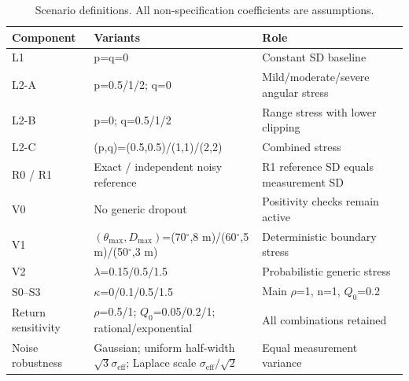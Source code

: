 \begin{table}[htbp]
\caption{Scenario definitions. All non-specification coefficients are assumptions.}\label{tab:4}
\small\setlength{\tabcolsep}{3pt}\renewcommand{\arraystretch}{1.15}
\begin{tabularx}{\linewidth}{>{\raggedright\arraybackslash}X>{\raggedright\arraybackslash}X>{\raggedright\arraybackslash}X}
\toprule
Component & Variants & Role \\
\midrule
L1 & p=q=0 & Constant SD baseline \\
L2-A & p=0.5/1/2; q=0 & Mild/moderate/severe angular stress \\
L2-B & p=0; q=0.5/1/2 & Range stress with lower clipping \\
L2-C & (p,q)=(0.5,0.5)/(1,1)/(2,2) & Combined stress \\
R0 / R1 & Exact / independent noisy reference & R1 reference SD equals measurement SD \\
V0 & No generic dropout & Positivity checks remain active \\
V1 & $(\theta_{\max},D_{\max})$=(70\texorpdfstring{\ensuremath{^\circ}}{ degrees},8 m)/(60\texorpdfstring{\ensuremath{^\circ}}{ degrees},5 m)/(50\texorpdfstring{\ensuremath{^\circ}}{ degrees},3 m) & Deterministic boundary stress \\
V2 & $\lambda$=0.15/0.5/1.5 & Probabilistic generic stress \\
S0--S3 & $\kappa$=0/0.1/0.5/1.5 & Main $\rho$=1, n=1, $Q_0$=0.2 \\
Return sensitivity & $\rho$=0.5/1; $Q_0$=0.05/0.2/1; rational/exponential & All combinations retained \\
Noise robustness & Gaussian; uniform half-width $\sqrt{3}\sigma_{\mathrm{eff}}$; Laplace scale $\sigma_{\mathrm{eff}}/\sqrt{2}$ & Equal measurement variance \\
\bottomrule
\end{tabularx}
\end{table}
